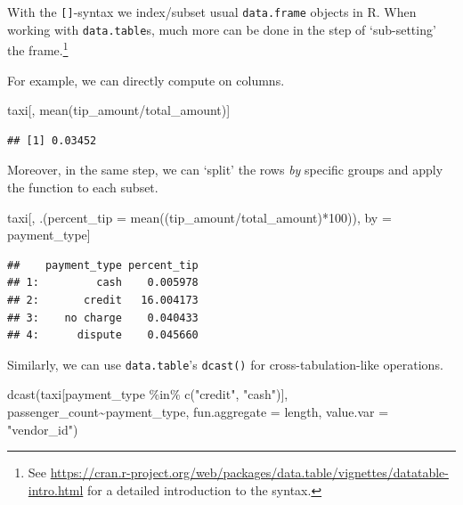 \documentclass[
  12pt,
]{style/krantz}
\newenvironment{Shaded}{\begin{snugshade}}{\end{snugshade}}
\newcommand{\AttributeTok}[1]{\textcolor[rgb]{0.77,0.63,0.00}{#1}}
\newcommand{\DecValTok}[1]{\textcolor[rgb]{0.00,0.00,0.81}{#1}}
\newcommand{\FunctionTok}[1]{\textcolor[rgb]{0.00,0.00,0.00}{#1}}
\newcommand{\NormalTok}[1]{#1}
\newcommand{\OtherTok}[1]{\textcolor[rgb]{0.56,0.35,0.01}{#1}}
\newcommand{\SpecialCharTok}[1]{\textcolor[rgb]{0.00,0.00,0.00}{#1}}
\newcommand{\StringTok}[1]{\textcolor[rgb]{0.31,0.60,0.02}{#1}}
\begin{document}
With the \texttt{{[}{]}}-syntax we index/subset usual \texttt{data.frame} objects in R. When working with \texttt{data.table}s, much more can be done in the step of `sub-setting' the frame.\footnote{See \url{https://cran.r-project.org/web/packages/data.table/vignettes/datatable-intro.html} for a detailed introduction to the syntax.}

For example, we can directly compute on columns.

\begin{Shaded}
\begin{Highlighting}[]
\NormalTok{taxi[, }\FunctionTok{mean}\NormalTok{(tip\_amount}\SpecialCharTok{/}\NormalTok{total\_amount)]}
\end{Highlighting}
\end{Shaded}

\begin{verbatim}
## [1] 0.03452
\end{verbatim}

Moreover, in the same step, we can `split' the rows \emph{by} specific groups and apply the function to each subset.

\begin{Shaded}
\begin{Highlighting}[]
\NormalTok{taxi[, .(}\AttributeTok{percent\_tip =} \FunctionTok{mean}\NormalTok{((tip\_amount}\SpecialCharTok{/}\NormalTok{total\_amount)}\SpecialCharTok{*}\DecValTok{100}\NormalTok{)), by }\OtherTok{=}\NormalTok{ payment\_type]}
\end{Highlighting}
\end{Shaded}

\begin{verbatim}
##    payment_type percent_tip
## 1:         cash    0.005978
## 2:       credit   16.004173
## 3:    no charge    0.040433
## 4:      dispute    0.045660
\end{verbatim}

Similarly, we can use \texttt{data.table}'s \texttt{dcast()} for cross-tabulation-like operations.

\begin{Shaded}
\begin{Highlighting}[]
\FunctionTok{dcast}\NormalTok{(taxi[payment\_type }\SpecialCharTok{\%in\%} \FunctionTok{c}\NormalTok{(}\StringTok{"credit"}\NormalTok{, }\StringTok{"cash"}\NormalTok{)],}
\NormalTok{      passenger\_count}\SpecialCharTok{\textasciitilde{}}\NormalTok{payment\_type, }
      \AttributeTok{fun.aggregate =}\NormalTok{ length,}
      \AttributeTok{value.var =} \StringTok{"vendor\_id"}\NormalTok{)}
\end{Highlighting}
\end{Shaded}
\end{document}

